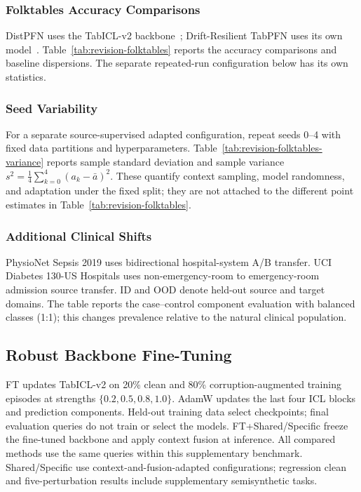 \subsubsection{Folktables Accuracy Comparisons}
\label{app:revision-folktables-comparison}
DistPFN uses the TabICL-v2 backbone~\citep{lee2026distpfn}; Drift-Resilient
TabPFN uses its own model~\citep{helli2024drifttabpfn}. Table~\ref{tab:revision-folktables}
reports the accuracy comparisons and baseline dispersions. The separate
repeated-run configuration below has its own statistics.




\subsubsection{Seed Variability}
\label{app:revision-folktables-variance}
For a separate source-supervised adapted configuration, repeat seeds 0--4 with
fixed data partitions and hyperparameters. Table~\ref{tab:revision-folktables-variance}
reports sample standard deviation and sample variance
$s^2=\frac14\sum_{k=0}^4(a_k-\bar a)^2$. These quantify context sampling,
model randomness, and adaptation under the fixed split; they are not attached
to the different point estimates in Table~\ref{tab:revision-folktables}.




\subsubsection{Additional Clinical Shifts}
\label{app:revision-medical}
PhysioNet Sepsis 2019 uses bidirectional hospital-system A/B transfer. UCI
Diabetes 130-US Hospitals uses non-emergency-room to emergency-room admission
source transfer. ID and OOD denote held-out source and target domains.
The table reports the case--control component evaluation with balanced classes
(1:1); this changes prevalence relative to the natural clinical population.




\subsection{Robust Backbone Fine-Tuning}
\label{app:revision-finetuning}
FT updates TabICL-v2 on 20\% clean and 80\% corruption-augmented training
episodes at strengths $\{0.2,0.5,0.8,1.0\}$. AdamW updates the last four ICL
blocks and prediction components. Held-out training data select checkpoints;
final evaluation queries do not train or select the models. FT+Shared/Specific
freeze the fine-tuned backbone and apply context fusion at inference.
All compared methods use the same queries within this supplementary benchmark.
Shared/Specific use context-and-fusion-adapted configurations; regression clean
and five-perturbation results include supplementary semisynthetic tasks.

